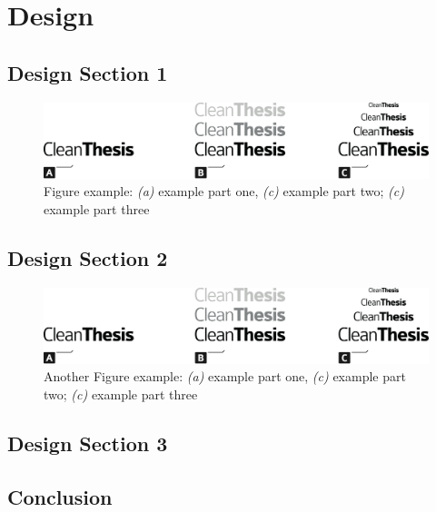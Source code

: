 %
\chapter{Design}
\label{sec:design}


\Blindtext[2][1]

\section{Design Section 1}
\label{sec:design:sec1}

\Blindtext[1][2]

\begin{figure}[htb]
	\includegraphics[width=\textwidth]{gfx/Clean-Thesis-Figure}
	\caption{Figure example: \textit{(a)} example part one, \textit{(c)} example part two; \textit{(c)} example part three}
	\label{fig:design:example1}
\end{figure}

\Blindtext[1][2]

\section{Design Section 2}
\label{sec:design:sec2}

\Blindtext[1][2]

\begin{figure}[htb]
	\includegraphics[width=\textwidth]{gfx/Clean-Thesis-Figure}
	\caption{Another Figure example: \textit{(a)} example part one, \textit{(c)} example part two; \textit{(c)} example part three}
	\label{fig:design:example2}
\end{figure}

\Blindtext[2][2]

\section{Design Section 3}
\label{sec:design:sec3}

\Blindtext[4][2]

\section{Conclusion}
\label{sec:design:conclusion}

\Blindtext[2][1]
